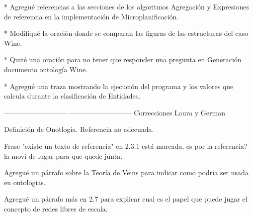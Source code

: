 * Agregué referencias a las secciones de los algoritmos Agregación y Expresiones de referencia en la implementación de Microplanificación.

* Modifiqué la oración donde se comparan las figuras de las estructuras del caso Wine.

* Quité una oración para no tener que responder una pregunta en Generación documento ontología Wine.

* Agregué una traza mostrando la ejecución del programa y los valores que calcula durante la clasificación de Entidades.



---------------------------
---------------------------
Correcciones Laura y German

Definición de Onotlogía. Referencia no adecuada. 

Frase "existe un texto de referencia" en 2.3.1 está marcada, es por la referencia? la moví de lugar para que quede junta.

Agregué un párrafo sobre la Teoría de Veins para indicar como podria ser usada en ontologias.

Agregué un párrafo más en 2.7 para explicar cual es el papel que puede jugar el concepto de redes libres de escala.


